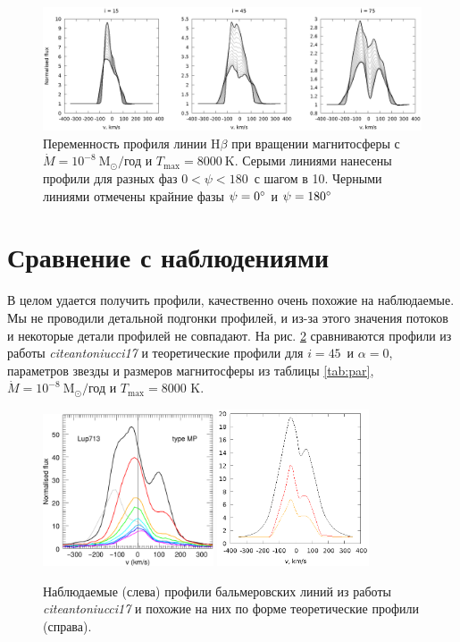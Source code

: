 \documentclass{article}
\begin{document}
\begin{figure}[h]
\centering
\includegraphics[width=\textwidth]{rot_8.eps}
\caption{Переменность профиля линии H$\beta$ при вращении магнитосферы с $\dot{M} = 10^{-8}\ \text{M}_\odot/$год и $T_\text{max} = 8000\ \text{K}$. Серыми линиями нанесены профили для разных фаз $0$\degree$< \psi < 180$\degree\ с шагом в 10\degree. Черными линиями отмечены крайние фазы $\psi = 0\text{\degree}$ и $\psi = 180\text{\degree}$}
\label{fig:rot8}
\end{figure}

\FloatBarrier

\section{Сравнение с наблюдениями}

В целом удается получить профили, качественно очень похожие на наблюдаемые. Мы не проводили детальной подгонки профилей, и из-за этого значения потоков и некоторые детали профилей не совпадают. На рис. \ref{fig:compprof} сравниваются профили из работы \textit{cite{antoniucci17}} и теоретические профили для $i = 45$\degree\ и $\alpha = 0$\degree, параметров звезды и размеров магнитосферы из таблицы \ref{tab:par}, $\dot{M} = 10^{-8}\ \text{M}_\odot/$год и $T_\text{max} = 8000$ K. 

\begin{figure}[h]
\centering
\includegraphics[width=0.45\textwidth]{profiles2.eps}
\includegraphics[width=0.4\textwidth]{lookslike45.eps}
\caption{Наблюдаемые (слева) профили бальмеровских линий из работы \textit{cite{antoniucci17}} и похожие на них по форме теоретические профили (справа).}
\label{fig:compprof}
\end{figure} 
\end{document}
